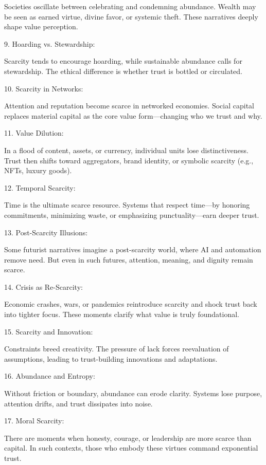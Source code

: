 \documentclass[11pt,oneside]{book}
\begin{document}
Societies oscillate between celebrating and condemning abundance. Wealth may be seen as earned virtue, divine favor, or systemic theft. These narratives deeply shape value perception.


9. Hoarding vs. Stewardship:

Scarcity tends to encourage hoarding, while sustainable abundance calls for stewardship. The ethical difference is whether trust is bottled or circulated.


10. Scarcity in Networks:

Attention and reputation become scarce in networked economies. Social capital replaces material capital as the core value form—changing who we trust and why.


11. Value Dilution:

In a flood of content, assets, or currency, individual units lose distinctiveness. Trust then shifts toward aggregators, brand identity, or symbolic scarcity (e.g., NFTs, luxury goods).


12. Temporal Scarcity:

Time is the ultimate scarce resource. Systems that respect time—by honoring commitments, minimizing waste, or emphasizing punctuality—earn deeper trust.


13. Post-Scarcity Illusions:

Some futurist narratives imagine a post-scarcity world, where AI and automation remove need. But even in such futures, attention, meaning, and dignity remain scarce.


14. Crisis as Re-Scarcity:

Economic crashes, wars, or pandemics reintroduce scarcity and shock trust back into tighter focus. These moments clarify what value is truly foundational.


15. Scarcity and Innovation:

Constraints breed creativity. The pressure of lack forces reevaluation of assumptions, leading to trust-building innovations and adaptations.


16. Abundance and Entropy:

Without friction or boundary, abundance can erode clarity. Systems lose purpose, attention drifts, and trust dissipates into noise.


17. Moral Scarcity:

There are moments when honesty, courage, or leadership are more scarce than capital. In such contexts, those who embody these virtues command exponential trust.
\end{document}
